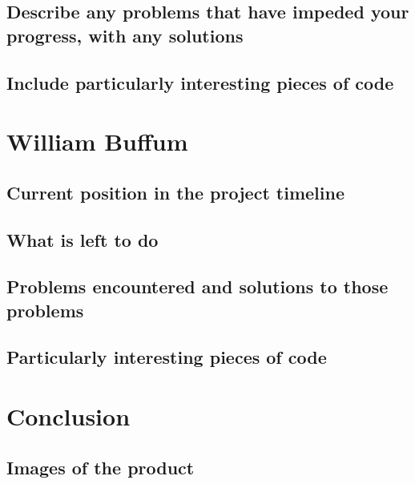 \documentclass[draftclsnofoot,onecolumn,letterpaper,10pt,compsoc]{IEEEtran}
\begin{document}
\subsection{Describe any problems that have impeded your progress, with any solutions}
\subsection{Include particularly interesting pieces of code}


\section{William Buffum}
\subsection{Current position in the project timeline}
\subsection{What is left to do}
\subsection{Problems encountered and solutions to those problems}
\subsection{Particularly interesting pieces of code}

\section{Conclusion}

\subsection{Images of the product}
\end{document}
